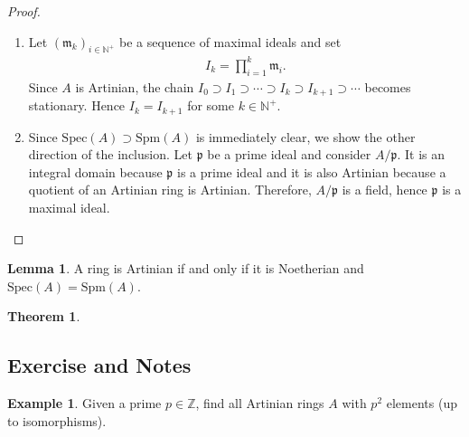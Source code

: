 \documentclass[a4paper]{book}
\theoremstyle{definition}
\newtheorem{example}{Example}[definition]
\newtheorem{theorem}[definition]{Theorem}
\newtheorem{lemma}[definition]{Lemma}
\begin{document}
\begin{proof}
    \begin{enumerate}
        \item Let \((\mathfrak{m}_k)_{i \in \mathbb{N}^+}\) be a sequence of maximal ideals and set
        \begin{align*}
            I_k = \prod_{i = 1}^k \mathfrak{m}_i \text{.}
        \end{align*}
        Since \(A\) is Artinian, the chain \(I_0 \supset I_1 \supset \cdots \supset I_k \supset I_{k+1} \supset \cdots\) becomes stationary. Hence \(I_k = I_{k + 1}\) for some \(k \in \mathbb{N}^+\).
        \item Since \(\mathrm{Spec}(A) \supset \mathrm{Spm}(A)\) is immediately clear, we show the other direction of the inclusion. Let \(\mathfrak{p}\) be a prime ideal and consider \(A/\mathfrak{p}\). It is an integral domain because \(\mathfrak{p}\) is a prime ideal and it is also Artinian because a quotient of an Artinian ring is Artinian. Therefore, \(A/\mathfrak{p}\) is a field, hence \(\mathfrak{p}\) is a maximal ideal.
    \end{enumerate}
\end{proof}

\begin{thmbox}
    \begin{lemma}
        A ring is Artinian if and only if it is Noetherian and \(\mathrm{Spec}(A) = \mathrm{Spm}(A)\).
    \end{lemma}
\end{thmbox}

\begin{thmbox}
    \begin{theorem}
        
    \end{theorem}
\end{thmbox}

\subsection*{Exercise and Notes}

\begin{example}
    Given a prime \(p \in \mathbb{Z}\), find all Artinian rings \(A\) with \(p^2\) elements (up to isomorphisms).
\end{example}
\end{document}
